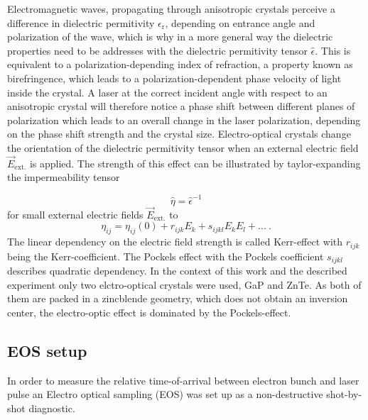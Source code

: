 Electromagnetic waves, propagating through anisotropic crystals perceive a difference in dielectric permitivity $\epsilon_\mathrm{r}$, depending on entrance angle and polarization of the wave, which is why in a more general way the dielectric properties need to be addresses with the dielectric permitivity tensor  $\hat{\epsilon}$.
This is equivalent to a polarization-depending index of refraction, a property known as birefringence, which leads to a polarization-dependent phase velocity of light inside the crystal. 
A laser at the correct incident angle with respect to an anisotropic crystal will therefore notice a phase shift between different planes of polarization which leads to an overall change in the laser polarization, depending on the phase shift strength and the crystal size. 
Electro-optical crystals change the orientation of the dielectric permitivity tensor when an external electric field $\vec{E}_\mathrm{ext.}$ is applied.
The strength of this effect can be illustrated by taylor-expanding the impermeability tensor 


\begin{equation}
\hat{\eta}=\hat{\epsilon}^{-1}
\end{equation}
for small external electric fields $\vec{E}_\mathrm{ext.}$ to
\begin{equation}
\eta_{ij}=\eta_{ij}(0)+r_{ijk}E_k+s_{ijkl}E_k E_l+...\ .
\end{equation}
The linear dependency on the electric field strength is called Kerr-effect with $r_{ijk}$ being the Kerr-coefficient. 
The Pockels effect with the Pockels coefficient $s_{ijkl}$ describes quadratic dependency.
In the context of this work and the described experiment only two elctro-optical crystals were used, GaP and ZnTe. 
As both of them are packed in a zincblende geometry, which does not obtain an inversion center, the electro-optic effect is dominated by the Pockels-effect.

\subsection*{EOS setup}
In order to measure the relative time-of-arrival between electron bunch and laser pulse an Electro optical sampling (EOS) was set up as a non-destructive shot-by-shot diagnostic.

